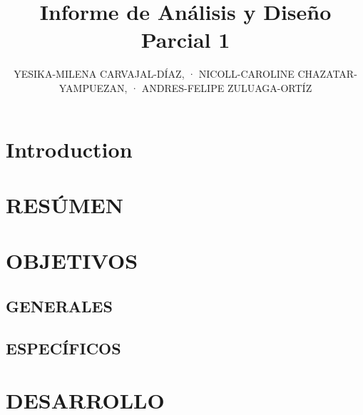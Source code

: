 \documentclass{ieeeojies}
\begin{document}
\tableofcontents

\title{Informe de Análisis y Diseño Parcial 1}
\author{\uppercase{YESIKA-MILENA CARVAJAL-DÍAZ}, \uppercase{ · NICOLL-CAROLINE CHAZATAR-YAMPUEZAN}, \uppercase{  · ANDRES-FELIPE ZULUAGA-ORTÍZ}}


\address[1]{Universidad de Antioquia, Medellín, Colombia.}
\address[2]{Ingeniería Electrónica, Facultad de Ingeniería, Universidad de Antioquia.}




\begin{abstract}
\end{abstract}


\begin{keywords}

\end{keywords}



\titlepgskip=-15pt

\maketitle

\section{Introduction}

\section{RESÚMEN}

\section{OBJETIVOS}

\subsection{GENERALES}

\subsection{ESPECÍFICOS}

\section{DESARROLLO}
\end{document}
